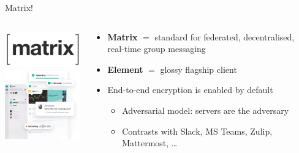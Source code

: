 \documentclass[aspectratio=169]{beamer}
\begin{document}
\begin{frame}{Matrix!}

  \begin{columns}
	\begin{column}{0.3\columnwidth}
	  \includegraphics[width=10em]{matrix-icon.png}\\
	  \includegraphics[width=12em]{For-Enterprise-new-tallest-p-800.png}
	\end{column}
	\begin{column}{0.7\columnwidth}
	    \begin{itemize}
		\item \textbf{Matrix} $=$ standard for federated, decentralised, real-time group messaging
		\item \textbf{Element} \(=\) glossy flagship client
		\item End-to-end encryption is enabled by default
          \begin{itemize}
          \item Adversarial model: servers are the adversary
          \item Contrasts with Slack, MS Teams, Zulip, Mattermost, \dots
          \end{itemize}
		\end{itemize}
	\end{column}
 \end{columns}

\end{frame}
\end{document}

